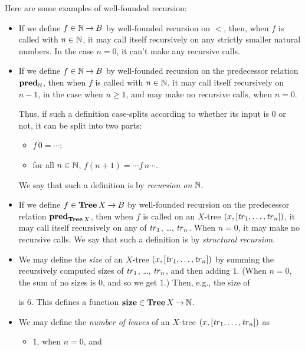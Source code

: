 Here are some examples of well-founded recursion:
\begin{itemize}
\item If we define $f\in\mathbb{N}\mathbin{\to} B$ by well-founded recursion on $<$,
  then, when $f$ is called with $n\in\mathbb{N}$, it may call itself
  recursively on any strictly smaller natural numbers.  In the case
  $n=0$, it can't make any recursive calls.

\item If we define $f\in\mathbb{N}\mathbin{\to} B$ by well-founded recursion on
  the predecessor relation $\mathrel{\mathbf{pred}}_{\mathbb{N}}$, then when $f$ is called with
  $n\in\mathbb{N}$, it may call itself recursively on $n-1$, in the
  case when $n\geq 1$, and may make no recursive calls, when $n=0$.

  Thus, if such a definition case-splits according to whether
  its input is $0$ or not, it can be split into two parts:
  \begin{itemize}
  \item $f\,0 = \cdots$;

  \item for all $n\in\mathbb{N}$, $f(n + 1) = \cdots f\,n \cdots$.
  \end{itemize}
  We say that such a definition is by \emph{recursion on} $\mathbb{N}$.

\item If we define $f\in\mathbf{Tree}\,X\mathbin{\to} B$ by well-founded recursion on
  the predecessor relation $\mathrel{\mathbf{pred}}_{\mathbf{Tree}\,X}$, then when $f$ is called
  on an $X$-tree $(x,[{\it tr}_1,\ldots,{\it tr}_n])$, it may call itself
  recursively on any of ${\it tr}_1$, \ldots, ${\it tr}_n$.  When $n=0$, it may
  make no recursive calls. We say that such a definition is by
  \emph{structural recursion}.
%

\item We may define the \emph{size} of an $X$-tree
  $(x,[{\it tr}_1,\ldots,{\it tr}_n])$ by summing the recursively computed sizes
  of ${\it tr}_1$, \ldots, ${\it tr}_n$, and then adding $1$. (When $n=0$, the
  sum of no sizes is $0$, and so we get $1$.) Then, e.g., the size of
\begin{center}

\end{center}
is $6$. This defines a function ${\mathrel{\mathbf{size}}}\in\mathbf{Tree}\,X\mathbin{\to}\mathbb{N}$.

\item We may define the \emph{number of leaves} of an $X$-tree
  $(x,[{\it tr}_1,\ldots,{\it tr}_n])$ as
  \begin{itemize}
  \item $1$, when $n=0$, and


\end{itemize}
\end{itemize}

